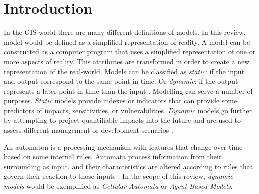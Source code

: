\documentclass[fleqn,10pt]{SelfArx} %
\affiliation{\textsuperscript{1}\textit{Department of Physical Geography and Ecosystem Science, Lund University, Sweden}} %
\affiliation{*\textbf{Corresponding author}: molgor@gmail.com} %
\begin{document}
\flushbottom %

\maketitle %


\thispagestyle{empty} %


\section{Introduction} %
In the GIS world there are many different definitions of models. In this review, model would be defined as a simplified representation of reality. A model can be constructed as a computer program that uses a simplified representation of one or more aspects of reality. This attributes are transformed in order to create a new representation of the real-world.
Models can be classified as {\em static}: if the input and output correspond to the same point in time. Or {\em dynamic}: if the output represents a later point in time than the input \citep{longley2005}. Modelling can serve a number of purposes. {\em Static} models provide indexes or indicators that can provide some predictors of impacts, sensitivities, or vulnerabilities. {\em Dynamic} models go further by attempting to project quantifiable impacts into the future and are used to assess different management or development scenarios \citep{abm_prin_conc}. 

An automaton is a processing mechanism with features that change over time based on some internal rules. Automata process information from their surrounding as input. and their characteristics are altered according to rules that govern their reaction to those inputs \citep{abm_prin_conc}. In the scope of this review, {\em dynamic models} would be exemplified as {\em Cellular Automata} or {\em Agent-Based Models}.
\end{document}
